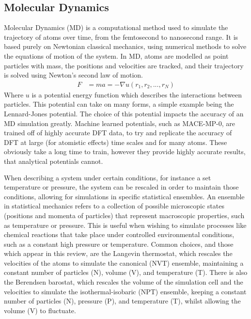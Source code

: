 \documentclass[10pt,a4paper,twocolumn,twoside]{extarticle}
\begin{document}
\subsection{Molecular Dynamics}
Molecular Dynamics (MD) is a computational method used to simulate the trajectory of atoms over time, from the femtosecond to nanosecond range. It is based purely on Newtonian classical mechanics, using numerical methods to solve the equations of motion of the system. In MD, atoms are modelled as point particles with mass, the positions and velocities are tracked, and their trajectory is solved using Newton's second law of motion.
\begin{align*}
	F &= ma = -\nabla u(r_1, r_2, ..., r_N)
\end{align*}
Where $u$ is a potential energy function which describes the interactions between particles. This potential can take on many forms, a simple example being the Lennard-Jones potential. The choice of this potential impacts the accuracy of an MD simulation greatly. Machine learned potentials, such as MACE-MP-0\cite{MACE}, are trained off of highly accurate DFT data, to try and replicate the accuracy of DFT at large (for atomistic effects) time scales and for many atoms. These obviously take a long time to train, however they provide highly accurate results, that analytical potentials cannot. 


When describing a system under certain conditions, for instance a set temperature or pressure, the system can be rescaled in order to maintain those conditions, allowing for simulations in specific statistical ensembles. An ensemble in statistical mechanics refers to a collection of possible microscopic states (positions and momenta of particles) that represent macroscopic properties, such as temperature or pressure. This is useful when wishing to simulate processes like chemical reactions that take place under controlled environmental conditions, such as a constant high pressure or temperature. Common choices, and those which appear in this review, are the Langevin thermostat, which rescales the velocities of the atoms to simulate the canonical (NVT) ensemble, maintaining a constant number of particles (N), volume (V), and temperature (T). There is also the Berendsen barostat, which rescales the volume of the simulation cell and the velocities to simulate the isothermal-isobaric (NPT) ensemble, keeping a constant number of particles (N), pressure (P), and temperature (T), whilst allowing the volume (V) to fluctuate.
\end{document}
